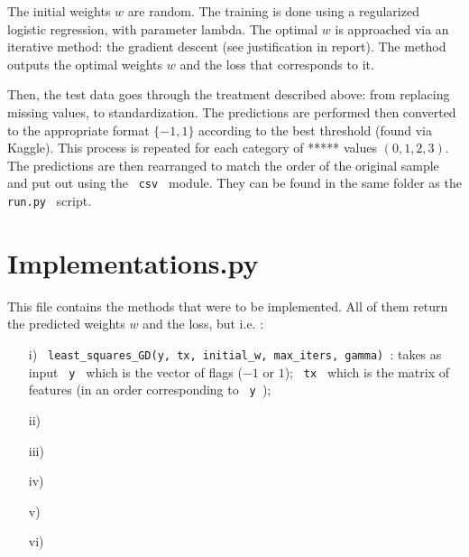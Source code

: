 \documentclass[11pt, oneside]{article}   	%
\begin{document}
The initial weights $w$ are random. The training is done using a regularized logistic regression, with parameter lambda. The optimal $w$ is approached via an iterative method: the gradient descent (see justification in report). The method outputs the optimal weights $w$ and the loss that corresponds to it.

Then, the test data goes through the treatment described above: from replacing missing values, to standardization. The predictions are performed then converted to the appropriate format $ \{ -1, 1 \}$ according to the best threshold (found via Kaggle). This process is repeated for each category of ***** values $(0,1,2,3)$. The predictions are then rearranged to match the order of the original sample and put out using the \lstinline" csv " module. They can be found in the same folder as the \lstinline" run.py " script.

\section{Implementations.py}

This file contains the methods that were to be implemented. All of them return the predicted weights $w$ and the loss, but   i.e. :
\begin{itemize}
\item[i)] \lstinline" least_squares_GD(y, tx, initial_w, max_iters, gamma) ": takes as input \lstinline" y " which is the vector of flags ($-1$ or $1$); \lstinline" tx " which is the matrix of features (in an order corresponding to \lstinline" y "); 
\item[ii)]
\item[iii)]
\item[iv)]
\item[v)]
\item[vi)]
\end{itemize}
\end{document}
